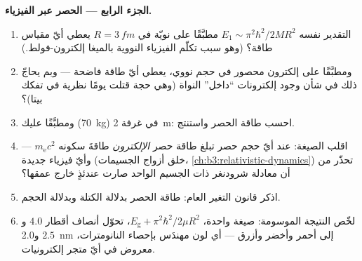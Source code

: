 \begin{problem}
\medskip\noindent\textbf{الجزء الرابع --- الحصر عبر الفيزياء.}
\begin{enumerate}[resume]
  \item التقدير نفسه $E_1 \sim \pi^2\hbar^2/2MR^2$ مطبَّقًا على
        نويّة في $R = \qty{3}{fm}$ يعطي أيّ مقياس طاقة؟ (وهو
        سبب تكلّم الفيزياء النووية بالميغا إلكترون-فولط.)
  \item ومطبَّقًا على إلكترون محصور في حجم نووي، يعطي
        أيّ طاقة فاضحة --- وبم يحاجّ ذلك في شأن وجود
        إلكترونات ``داخل'' النواة (وهي حجة قتلت يومًا نظرية في تفكك بيتا)؟
  \item ومطبَّقًا عليك (\qty{70}{kg}) في غرفة \qty{2}{m}: احسب
        طاقة الحصر واستنتج.
  \item اقلب الصيغة: عند أيّ حجم حصر تبلغ طاقة حصر
        \emph{الإلكترون} طاقةَ سكونه
        $m_{\text{e}}c^2$ --- وأيّ فيزياء جديدة (خلق أزواج
        الجسيمات، \cref{ch:b3:relativistic-dynamics}) تحذّر
        من أن معادلة شرودنغر ذات الجسيم الواحد صارت عندئذٍ خارج
        عمقها؟
  \item اذكر قانون التغير العام: طاقة الحصر بدلالة
        الكتلة وبدلالة الحجم.
  \item لخّص النتيجة الموسومة: صيغة واحدة،
        $E_{\text{g}} + \pi^2\hbar^2/2\mu R^2$، تحوّل أنصاف أقطار
        $4.0$ و $2.5$ و\qty{2.0}{nm} إلى أحمر وأخضر وأزرق ---
        أي لون مهندَس بإحصاء النانومترات، معروض في أيّ
        متجر إلكترونيات.
\end{enumerate}
\end{problem}
